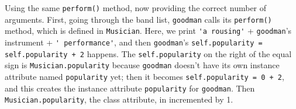 \begin{blocksection}
\begin{solution}[.2in]
Using the same \lstinline{perform()} method, now providing the correct number of arguments. First, going through the band list, \lstinline{goodman} calls its \lstinline{perform()} method, which is defined in \lstinline{Musician}. Here, we print \lstinline{'a rousing'} + \lstinline{goodman}'s instrument + \lstinline{' performance'}, and then \lstinline{goodman}'s \lstinline{self.popularity = self.popularity + 2} happens. The \lstinline{self.popularity} on the right of the equal sign is \lstinline{Musician.popularity} because \lstinline{goodman} doesn't have its own instance attribute named \lstinline{popularity} yet; then it becomes \lstinline{self.popularity = 0 + 2}, and this creates the instance attribute \lstinline{popularity} for \lstinline{goodman}. Then \lstinline{Musician.popularity}, the class attribute, in incremented by 1.
\end{solution}
\end{blocksection}

\vspace{2\baselineskip}

